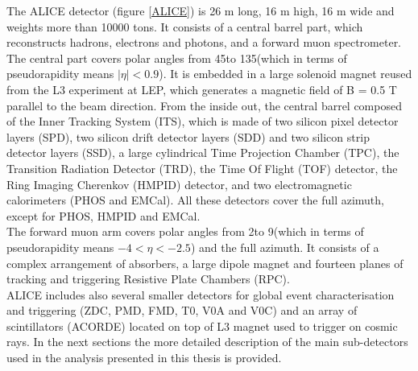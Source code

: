 \documentclass[b5paper,10pt,twoside,oldstyle,classica]{toptesi}
\begin{document}
The ALICE detector (figure \ref{ALICE}) is 26 m long, 16 m high, 16 m wide and weights more than 10000 tons. It consists of a central barrel part, which reconstructs hadrons, electrons and photons, and a forward muon spectrometer. The central part covers polar angles from 45\textdegree \space to 135\textdegree \space (which in terms of pseudorapidity means $|\eta| < 0.9$). It is embedded in a large solenoid magnet reused from the L3 experiment at LEP, which generates a magnetic field of B = 0.5 T parallel to the beam direction. From the inside out, the central barrel composed of the Inner Tracking System (ITS), which is made of two silicon pixel detector layers (SPD), two silicon drift detector layers (SDD) and two silicon strip detector layers (SSD), a large cylindrical Time Projection Chamber (TPC), the Transition Radiation Detector (TRD), the Time Of Flight (TOF) detector, the Ring Imaging Cherenkov (HMPID) detector, and two electromagnetic calorimeters (PHOS and EMCal). All these detectors cover the full azimuth, except for PHOS, HMPID and EMCal.\\
The forward muon arm covers polar angles from 2\textdegree \space to 9\textdegree \space(which in terms of pseudorapidity means $-4 < \eta < -2.5$) and the full azimuth. It consists of a complex arrangement of absorbers, a large dipole magnet and fourteen planes of tracking and triggering Resistive Plate Chambers (RPC).\\
ALICE includes also several smaller detectors for global event characterisation and triggering (ZDC, PMD, FMD, T0, V0A and V0C) and an array of scintillators (ACORDE) located on top of L3 magnet used to trigger on cosmic rays.
In the next sections the more detailed description of the main sub-detectors used in the analysis presented in this thesis is provided.
\end{document}
